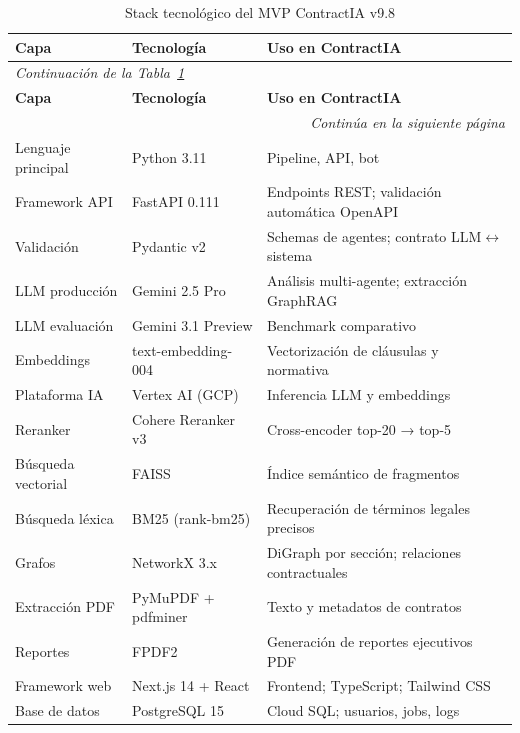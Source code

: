 \begin{longtable}{p{3.2cm} p{3.8cm} p{6.5cm}}
\caption{Stack tecnológico del MVP ContractIA v9.8}
\label{tab:stack_completo} \\
\toprule
\textbf{Capa} & \textbf{Tecnología} & \textbf{Uso en ContractIA} \\
\midrule
\endfirsthead
\multicolumn{3}{l}{\small\itshape Continuación de la Tabla~\ref{tab:stack_completo}} \\[4pt]
\toprule
\textbf{Capa} & \textbf{Tecnología} & \textbf{Uso en ContractIA} \\
\midrule
\endhead
\midrule
\multicolumn{3}{r}{\small\itshape Continúa en la siguiente página} \\
\endfoot
\bottomrule
\endlastfoot
Lenguaje principal  & Python 3.11          & Pipeline, API, bot \\[6pt]
Framework API       & FastAPI 0.111        & Endpoints REST; validación automática OpenAPI \\[6pt]
Validación          & Pydantic v2          & Schemas de agentes; contrato LLM$\leftrightarrow$sistema \\[6pt]
LLM producción      & Gemini 2.5 Pro       & Análisis multi-agente; extracción GraphRAG \\[6pt]
LLM evaluación      & Gemini 3.1 Preview   & Benchmark comparativo \\[6pt]
Embeddings          & text-embedding-004   & Vectorización de cláusulas y normativa \\[6pt]
Plataforma IA       & Vertex AI (GCP)      & Inferencia LLM y embeddings \\[6pt]
Reranker            & Cohere Reranker v3   & Cross-encoder top-20 → top-5 \\[6pt]
Búsqueda vectorial  & FAISS                & Índice semántico de fragmentos \\[6pt]
Búsqueda léxica     & BM25 (rank-bm25)     & Recuperación de términos legales precisos \\[6pt]
Grafos              & NetworkX 3.x         & DiGraph por sección; relaciones contractuales \\[6pt]
Extracción PDF      & PyMuPDF + pdfminer   & Texto y metadatos de contratos \\[6pt]
Reportes            & FPDF2                & Generación de reportes ejecutivos PDF \\[6pt]
Framework web       & Next.js 14 + React   & Frontend; TypeScript; Tailwind CSS \\[6pt]
Base de datos       & PostgreSQL 15        & Cloud SQL; usuarios, jobs, logs \\[6pt]

\end{longtable}
